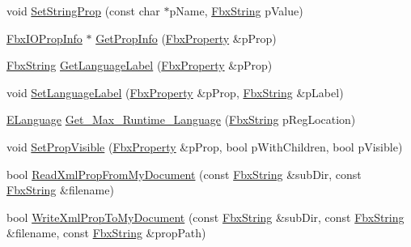\begin{DoxyCompactItemize}
void \hyperlink{class_fbx_i_o_settings_aadffc404d2cfc79ee842265c46abbc12}{Set\+String\+Prop} (const char $\ast$p\+Name, \hyperlink{class_fbx_string}{Fbx\+String} p\+Value)
\item 
\hyperlink{class_fbx_i_o_prop_info}{Fbx\+I\+O\+Prop\+Info} $\ast$ \hyperlink{class_fbx_i_o_settings_a04310e1fd32d0f8852eef9dae52aab54}{Get\+Prop\+Info} (\hyperlink{class_fbx_property}{Fbx\+Property} \&p\+Prop)
\item 
\hyperlink{class_fbx_string}{Fbx\+String} \hyperlink{class_fbx_i_o_settings_a2588777e1bbeed1602e2538fa47cd986}{Get\+Language\+Label} (\hyperlink{class_fbx_property}{Fbx\+Property} \&p\+Prop)
\item 
void \hyperlink{class_fbx_i_o_settings_ac2fc08a0a553a6fc6c4e5e9891b6ad38}{Set\+Language\+Label} (\hyperlink{class_fbx_property}{Fbx\+Property} \&p\+Prop, \hyperlink{class_fbx_string}{Fbx\+String} \&p\+Label)
\item 
\hyperlink{class_fbx_i_o_settings_a84f2effd8e41c382faa5ca58046f323f}{E\+Language} \hyperlink{class_fbx_i_o_settings_a253fc042fe3d373a9e1c369ac2d2bd27}{Get\+\_\+\+Max\+\_\+\+Runtime\+\_\+\+Language} (\hyperlink{class_fbx_string}{Fbx\+String} p\+Reg\+Location)
\item 
void \hyperlink{class_fbx_i_o_settings_a23c19390ac805e94866ae738953bb479}{Set\+Prop\+Visible} (\hyperlink{class_fbx_property}{Fbx\+Property} \&p\+Prop, bool p\+With\+Children, bool p\+Visible)
\item 
bool \hyperlink{class_fbx_i_o_settings_a843dcbf01c90245e4bfc08effe999acc}{Read\+Xml\+Prop\+From\+My\+Document} (const \hyperlink{class_fbx_string}{Fbx\+String} \&sub\+Dir, const \hyperlink{class_fbx_string}{Fbx\+String} \&filename)
\item 
bool \hyperlink{class_fbx_i_o_settings_a7cdebdeff147dbdb99faaadc874e5d69}{Write\+Xml\+Prop\+To\+My\+Document} (const \hyperlink{class_fbx_string}{Fbx\+String} \&sub\+Dir, const \hyperlink{class_fbx_string}{Fbx\+String} \&filename, const \hyperlink{class_fbx_string}{Fbx\+String} \&prop\+Path)
\end{DoxyCompactItemize}
